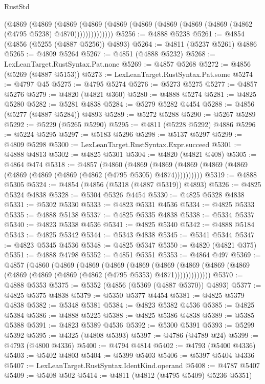 \begin{lexlean}{RustStd}
\begin{coremodule}
{\begin{coremodule}
{{{{{{{{{{{{{{{{{{{{{{{{{{{{{{{{{{{{{{{{{{{{{{{{{{{{{{{{{{{{{{{{{{{{{{{{{{{{{{{{            (@4869
              (@4869
                (@4869
                  (@4869 (@4869 (@4869 (@4869 (@4869 (@4869 (@4862 (@4795 @5238) @4870))))))))))))))
@5256 := @4888 @5238
@5261 := @4854 (@4856 (@5255 (@4887 @5256)) @4893)
@5264 := @4811 (@5237 @5261) @4886
@5265 := @4809 @5264
@5267 := @4851 (@4888 @5232)
@5268 := LexLeanTarget.RustSyntax.Pat.none
@5269 := @4857 @5268
@5272 := @4856 (@5269 (@4887 @5153))
@5273 := LexLeanTarget.RustSyntax.Pat.some
@5274 := @4797 @45
@5275 := @4795 @5274
@5276 := @5273 @5275
@5277 := @4857 @5276
@5279 := @4820 (@4821 @360)
@5280 := @4888 @5274
@5281 := @4825 @5280
@5282 := @5281 @4838
@5284 := @5279 @5282 @4454
@5288 := @4856 (@5277 (@4887 @5284)) @4893
@5289 := @5272 @5288
@5290 := @5267 @5289
@5292 := @5229 (@5265 @5290)
@5295 := @4811 (@5228 @5292) @4886
@5296 := @5224 @5295
@5297 := @5183 @5296
@5298 := @5137 @5297
@5299 := @4809 @5298
@5300 := LexLeanTarget.RustSyntax.Expr.succeed
@5301 := @4888 @4813
@5302 := @4825 @5301
@5304 := @4820 (@4821 @408)
@5305 := @4864 @474
@5318 := @4857
    (@4860
      (@4869 (@4869 (@4869 (@4869 (@4869 (@4869 (@4869 (@4869 (@4862 (@4795 @5305) @4874))))))))))
@5319 := @4888 @5305
@5324 := @4854 (@4856 (@5318 (@4887 @5319)) @4893)
@5326 := @4825 @5324 @4838
@5328 := @5304 @5326 @4454
@5330 := @4825 @5328 @4838
@5331 := @5302 @5330
@5333 := @4823 @5331 @4536
@5334 := @4825 @5333
@5335 := @4888 @5138
@5337 := @4825 @5335 @4838
@5338 := @5334 @5337
@5340 := @4823 @5338 @4536
@5341 := @4825 @5340
@5342 := @4888 @5184
@5343 := @4825 @5342
@5344 := @5343 @4838
@5345 := @5341 @5344
@5347 := @4823 @5345 @4536
@5348 := @4825 @5347
@5350 := @4820 (@4821 @375)
@5351 := @4888 @4798
@5352 := @4851 @5351
@5353 := @4864 @497
@5369 := @4857
    (@4860
      (@4869
        (@4869
          (@4869
            (@4869
              (@4869
                (@4869 (@4869 (@4869 (@4869 (@4869 (@4869 (@4862 (@4795 @5353) @4871)))))))))))))
@5370 := @4888 @5353
@5375 := @5352 (@4856 (@5369 (@4887 @5370)) @4893)
@5377 := @4825 @5375 @4838
@5379 := @5350 @5377 @4454
@5381 := @4825 @5379 @4838
@5382 := @5348 @5381
@5384 := @4823 @5382 @4536
@5385 := @4825 @5384
@5386 := @4888 @5225
@5388 := @4825 @5386 @4838
@5389 := @5385 @5388
@5391 := @4823 @5389 @4536
@5392 := @5300 @5391
@5393 := @5299 @5392
@5395 := @4325 (@4808 @5393)
@5397 := @4786 (@4789 @24)
@5399 := @4793 (@4800 @4336)
@5400 := @4794 @4814
@5402 := @4793 (@5400 @4336)
@5403 := @5402 @4803
@5404 := @5399 @5403
@5406 := @5397 @5404 @4336
@5407 := LexLeanTarget.RustSyntax.IdentKind.operand
@5408 := @4787 @5407
@5409 := @5408 @502
@5414 := @4811 (@4812 (@4795 @5409) @5236 @5351)
}}}}}}}}}}}}}}}}}}}}}}}}}}}}}}}}}}}}}}}}}}}}}}}}}}}}}}}}}}}}}}}}}}}}}}}}}}}}}}}}
\end{coremodule}}
\end{coremodule}
\end{lexlean}
